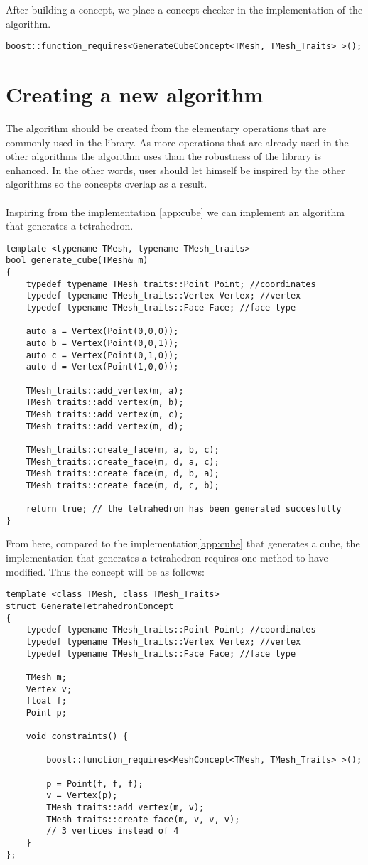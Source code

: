 \begin{appendices}
After building a concept, we place a concept checker in the implementation
of the algorithm.

\begin{lstlisting}
boost::function_requires<GenerateCubeConcept<TMesh, TMesh_Traits> >();
\end{lstlisting}

\section{Creating a new algorithm}

The algorithm should be created from the elementary operations that are commonly used in the
library. As more operations that are already used in the other algorithms
the algorithm uses than the robustness of the library is enhanced. In the other words,
user should let himself be inspired by the other algorithms so the concepts overlap as a result.
\\
\\
Inspiring from the implementation \ref{app:cube} we can implement an algorithm that generates
a tetrahedron.
\begin{lstlisting}
template <typename TMesh, typename TMesh_traits>
bool generate_cube(TMesh& m)
{
	typedef typename TMesh_traits::Point Point; //coordinates
	typedef typename TMesh_traits::Vertex Vertex; //vertex
	typedef typename TMesh_traits::Face Face; //face type
	
	auto a = Vertex(Point(0,0,0));
	auto b = Vertex(Point(0,0,1));
	auto c = Vertex(Point(0,1,0));
	auto d = Vertex(Point(1,0,0));
	
	TMesh_traits::add_vertex(m, a);
	TMesh_traits::add_vertex(m, b);
	TMesh_traits::add_vertex(m, c);
	TMesh_traits::add_vertex(m, d);

	TMesh_traits::create_face(m, a, b, c);
	TMesh_traits::create_face(m, d, a, c);
	TMesh_traits::create_face(m, d, b, a);
	TMesh_traits::create_face(m, d, c, b);
	
	return true; // the tetrahedron has been generated succesfully
}
\end{lstlisting}

From here, compared to the implementation\ref{app:cube} that generates a cube, the implementation
that generates a tetrahedron requires one method to have modified. Thus the concept will be as follows:

\begin{lstlisting}
template <class TMesh, class TMesh_Traits>
struct GenerateTetrahedronConcept
{
	typedef typename TMesh_traits::Point Point; //coordinates
	typedef typename TMesh_traits::Vertex Vertex; //vertex
	typedef typename TMesh_traits::Face Face; //face type

	TMesh m;
	Vertex v;
	float f;
	Point p;

	void constraints() {

		boost::function_requires<MeshConcept<TMesh, TMesh_Traits> >();

		p = Point(f, f, f);
		v = Vertex(p);
		TMesh_traits::add_vertex(m, v);
		TMesh_traits::create_face(m, v, v, v);
		// 3 vertices instead of 4
	}
};
\end{lstlisting}

\end{appendices}